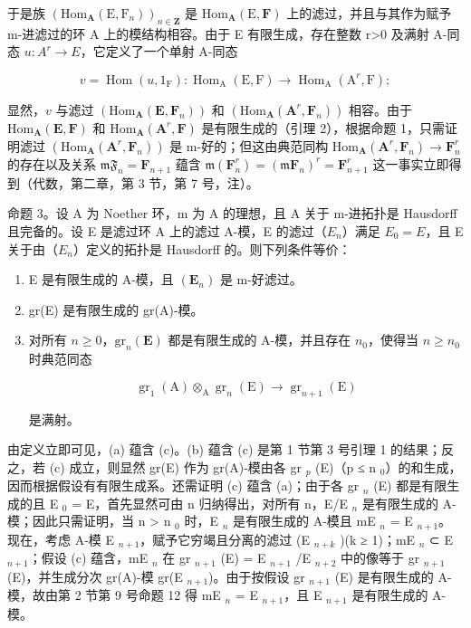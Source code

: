 于是族 \((\mathrm{Hom}_{\mathbf{A}}(\mathrm{E},\mathrm{F}_{n}))_{n\in\mathbf{Z}}\) 是 \(\mathrm{Hom}_{\mathbf{A}}(\mathrm{E},\mathbf{F})\) 上的滤过，并且与其作为赋予 m-进滤过的环 A 上的模结构相容。由于 E 有限生成，存在整数 r\textgreater0 及满射 A-同态 \(u:A^{r}\rightarrow E\)，它定义了一个单射 A-同态

\[
v = \operatorname{Hom} (u, 1 _ {\mathrm{F}}): \operatorname{Hom} _ {\mathrm{A}} (\mathrm{E}, \mathrm{F}) \rightarrow \operatorname{Hom} _ {\mathrm{A}} (\mathrm{A} ^ {r}, \mathrm{F});
\]

显然，\(v\) 与滤过 \((\mathrm{Hom}_{\mathbf{A}}(\mathbf{E},\mathbf{F}_n))\) 和 \((\mathrm{Hom}_{\mathbf{A}}(\mathbf{A}^r,\mathbf{F}_n))\) 相容。由于 \(\mathrm{Hom}_{\mathbf{A}}(\mathbf{E},\mathbf{F})\) 和 \(\mathrm{Hom}_{\mathbf{A}}(\mathbf{A}^r,\mathbf{F})\) 是有限生成的（引理 2），根据命题 1，只需证明滤过 \((\mathrm{Hom}_{\mathbf{A}}(\mathbf{A}^{r},\mathbf{F}_{n}))\) 是 m-好的；但这由典范同构 \(\mathrm{Hom}_{\mathbf{A}}(\mathbf{A}^{r},\mathbf{F}_{n})\to \mathbf{F}_{n}^{r}\) 的存在以及关系 \(\mathfrak{mF}_n = \mathbf{F}_{n + 1}\) 蕴含 \(\mathfrak{m}(\mathbf{F}_n^r) = (\mathfrak{m}\mathbf{F}_n)^r = \mathbf{F}_{n + 1}^r\) 这一事实立即得到（代数，第二章，第 3 节，第 7 号，注）。

命题 3。设 A 为 Noether 环，m 为 A 的理想，且 A 关于 m-进拓扑是 Hausdorff 且完备的。设 E 是滤过环 A 上的滤过 A-模，E 的滤过（\(E_{n}\)）满足 \(E_{0} = E\)，且 E 关于由（\(E_{n}\)）定义的拓扑是 Hausdorff 的。则下列条件等价：

\begin{enumerate}
\def\labelenumi{(\alph{enumi})}
\item
  E 是有限生成的 A-模，且 \((\mathbf{E}_{n})\) 是 m-好滤过。
\item
  gr(E) 是有限生成的 gr(A)-模。
\item
  对所有 \(n \geqslant 0\)，\(\mathrm{gr}_n(\mathbf{E})\) 都是有限生成的 A-模，并且存在 \(n_0\)，使得当 \(n \geqslant n_0\) 时典范同态

\[
\operatorname{gr} _ {1} (\mathrm{A}) \otimes_ {\mathrm{A}} \operatorname{gr} _ {n} (\mathrm{E}) \rightarrow \operatorname{gr} _ {n + 1} (\mathrm{E})\tag{3}
\]

是满射。
\end{enumerate}

由定义立即可见，(a) 蕴含 (c)。(b) 蕴含 (c) 是第 1 节第 3 号引理 1 的结果；反之，若 (c) 成立，则显然 gr(E) 作为 gr(A)-模由各 gr \(_{p}\) (E)（p ≤ n \(_{0}\)）的和生成，因而根据假设有有限生成系。还需证明 (c) 蕴含 (a)；由于各 gr \(_{n}\) (E) 都是有限生成的且 E \(_{0}\) = E，首先显然可由 n 归纳得出，对所有 n，E/E \(_{n}\) 是有限生成的 A-模；因此只需证明，当 n \textgreater{} n \(_{0}\) 时，E \(_{n}\) 是有限生成的 A-模且 mE \(_{n}\) = E \(_{n+1}\)。现在，考虑 A-模 E \(_{n+1}\)，赋予它穷竭且分离的滤过 (E \(_{n+k}\) )(k ≥ 1)；mE \(_{n}\) ⊂ E \(_{n+1}\)；假设 (c) 蕴含，mE \(_{n}\) 在 gr \(_{n+1}\) (E) = E \(_{n+1}\) /E \(_{n+2}\) 中的像等于 gr \(_{n+1}\) (E)，并生成分次 gr(A)-模 gr(E \(_{n+1}\))。由于按假设 gr \(_{n+1}\) (E) 是有限生成的 A-模，故由第 2 节第 9 号命题 12 得 mE \(_{n}\) = E \(_{n+1}\)，且 E \(_{n+1}\) 是有限生成的 A-模。


